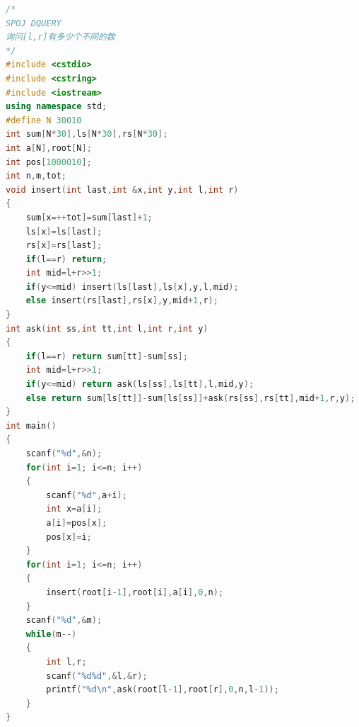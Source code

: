 \documentclass[UTF8,a4paper,titlepage]{ctexart}
\begin{document}
\begin{lstlisting}[language=C++]
/*
SPOJ DQUERY
询问[l,r]有多少个不同的数
*/
#include <cstdio>
#include <cstring>
#include <iostream>
using namespace std;
#define N 30010
int sum[N*30],ls[N*30],rs[N*30];
int a[N],root[N];
int pos[1000010];
int n,m,tot;
void insert(int last,int &x,int y,int l,int r)
{
    sum[x=++tot]=sum[last]+1;
    ls[x]=ls[last];
    rs[x]=rs[last];
    if(l==r) return;
    int mid=l+r>>1;
    if(y<=mid) insert(ls[last],ls[x],y,l,mid);
    else insert(rs[last],rs[x],y,mid+1,r);
}
int ask(int ss,int tt,int l,int r,int y)
{
    if(l==r) return sum[tt]-sum[ss];
    int mid=l+r>>1;
    if(y<=mid) return ask(ls[ss],ls[tt],l,mid,y);
    else return sum[ls[tt]]-sum[ls[ss]]+ask(rs[ss],rs[tt],mid+1,r,y);
}
int main()
{
    scanf("%d",&n);
    for(int i=1; i<=n; i++)
    {
        scanf("%d",a+i);
        int x=a[i];
        a[i]=pos[x];
        pos[x]=i;
    }
    for(int i=1; i<=n; i++)
    {
        insert(root[i-1],root[i],a[i],0,n);
    }
    scanf("%d",&m);
    while(m--)
    {
        int l,r;
        scanf("%d%d",&l,&r);
        printf("%d\n",ask(root[l-1],root[r],0,n,l-1));
    }
}
    \end{lstlisting}
\end{document}
